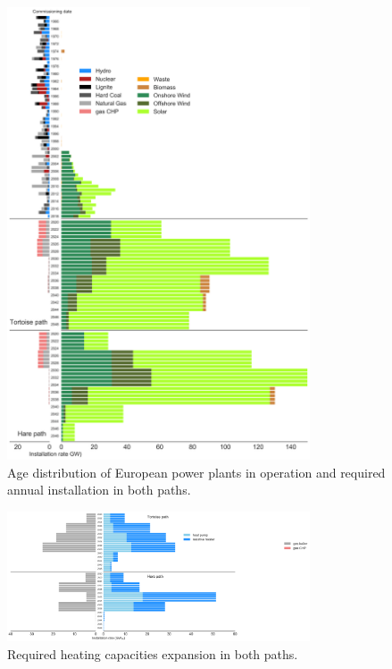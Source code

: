 \documentclass[5p]{elsarticle} %
\begin{document}
\begin{figure}[!h]
\centering
\includegraphics[width=0.8\textwidth]{figures/age_distribution_w_TYNDP.png}
\caption{Age distribution of European power plants in operation \cite{powerplantmatching, IRENA_2019} and required annual installation in both paths.} \label{fig_age_distribution} 
\end{figure}

\begin{figure}[!h]
\centering
\includegraphics[width=0.8\textwidth]{figures/heating_expansion_w_TYNDP.png}
\caption{Required heating capacities expansion in both paths.} \label{fig_heating_expansion} 
\end{figure}
\end{document}
